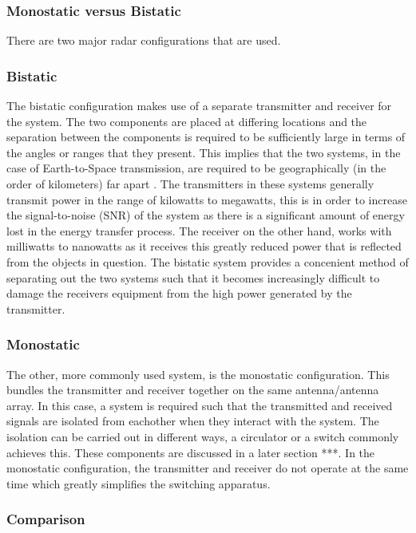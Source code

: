 \documentclass[11pt]{witseiepaper}
\begin{document}
\subsubsection{Monostatic versus Bistatic}

There are two major radar configurations that are used. 

\subsubsection{Bistatic}

The bistatic configuration makes use of a separate transmitter and receiver for the system. The two components are placed at differing locations and the separation between the components is required to be sufficiently large in terms of the angles or ranges that they present.
This implies that the two systems, in the case of Earth-to-Space transmission, are required to be geographically (in the order of kilometers) far apart \cite{bistaticNato}.
The transmitters in these systems generally transmit power in the range of kilowatts to megawatts, this is in order to increase the signal-to-noise (SNR) of the system as there is a significant amount of energy lost in the energy transfer process. The receiver on the other hand, works with milliwatts to nanowatts as it receives this greatly reduced power that is reflected from the objects in question. The bistatic system provides a concenient method of separating out the two systems such that it becomes increasingly difficult to damage the receivers equipment from the high power generated by the transmitter.

\subsubsection{Monostatic}

The other, more commonly used system, is the monostatic configuration. This bundles the transmitter and receiver together on the same antenna/antenna array. In this case, a system is required such that the transmitted and received signals are isolated from eachother when they interact with the system. The isolation can be carried out in different ways, a circulator or a switch commonly achieves this. These components are discussed in a later section ***. In the monostatic configuration, the transmitter and receiver do not operate at the same time which greatly simplifies the switching apparatus.

\subsubsection{Comparison}
\end{document}
